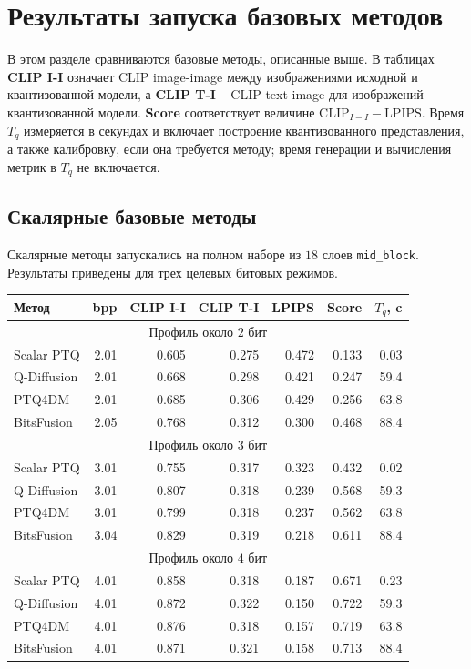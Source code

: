 \documentclass[a4paper,12pt]{article}
\begin{document}
\section{Результаты запуска базовых методов}

В этом разделе сравниваются базовые методы, описанные выше. В таблицах \textbf{CLIP I-I} означает CLIP image-image между изображениями исходной и квантизованной модели, а \textbf{CLIP T-I}~- CLIP text-image для изображений квантизованной модели. \textbf{Score} соответствует величине $\mathrm{CLIP}_{I-I} - \mathrm{LPIPS}$. Время $T_q$ измеряется в секундах и включает построение квантизованного представления, а также калибровку, если она требуется методу; время генерации и вычисления метрик в $T_q$ не включается.

\subsection{Скалярные базовые методы}

Скалярные методы запускались на полном наборе из $18$ слоев \texttt{mid\_block}. Результаты приведены для трех целевых битовых режимов.

\begin{center}
\small
\begin{tabular}{lrrrrrr}
\hline
Метод & bpp & CLIP I-I & CLIP T-I & LPIPS & Score & $T_q$, c \\
\hline
\multicolumn{7}{c}{Профиль около $2$ бит} \\
\hline
Scalar PTQ & 2.01 & 0.605 & 0.275 & 0.472 & 0.133 & 0.03 \\
Q-Diffusion & 2.01 & 0.668 & 0.298 & 0.421 & 0.247 & 59.4 \\
PTQ4DM & 2.01 & 0.685 & 0.306 & 0.429 & 0.256 & 63.8 \\
BitsFusion & 2.05 & 0.768 & 0.312 & 0.300 & 0.468 & 88.4 \\
\hline
\multicolumn{7}{c}{Профиль около $3$ бит} \\
\hline
Scalar PTQ & 3.01 & 0.755 & 0.317 & 0.323 & 0.432 & 0.02 \\
Q-Diffusion & 3.01 & 0.807 & 0.318 & 0.239 & 0.568 & 59.3 \\
PTQ4DM & 3.01 & 0.799 & 0.318 & 0.237 & 0.562 & 63.8 \\
BitsFusion & 3.04 & 0.829 & 0.319 & 0.218 & 0.611 & 88.4 \\
\hline
\multicolumn{7}{c}{Профиль около $4$ бит} \\
\hline
Scalar PTQ & 4.01 & 0.858 & 0.318 & 0.187 & 0.671 & 0.23 \\
Q-Diffusion & 4.01 & 0.872 & 0.322 & 0.150 & 0.722 & 59.3 \\
PTQ4DM & 4.01 & 0.876 & 0.318 & 0.157 & 0.719 & 63.8 \\
BitsFusion & 4.01 & 0.871 & 0.321 & 0.158 & 0.713 & 88.4 \\
\hline
\end{tabular}
\end{center}
\end{document}
